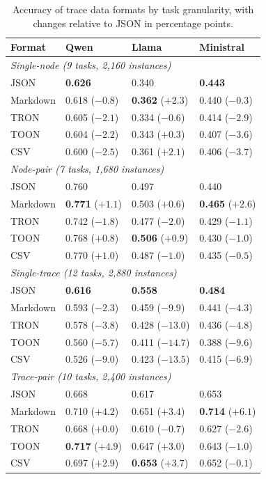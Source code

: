 \begin{table}[t]
\centering
\caption{Accuracy of trace data formats by task granularity, with changes relative to JSON in percentage points.}
\label{tab:rq1_granularity}
\begin{tabularx}{\columnwidth}{lXXX}
\toprule
Format & Qwen & Llama & Ministral \\
\midrule
\multicolumn{4}{l}{\textit{Single-node (9 tasks, 2,160 instances)}} \\
JSON & \textbf{0.626} & 0.340 & \textbf{0.443} \\
Markdown & 0.618 ($-0.8$) & \textbf{0.362} ($+2.3$) & 0.440 ($-0.3$) \\
TRON & 0.605 ($-2.1$) & 0.334 ($-0.6$) & 0.414 ($-2.9$) \\
TOON & 0.604 ($-2.2$) & 0.343 ($+0.3$) & 0.407 ($-3.6$) \\
CSV & 0.600 ($-2.5$) & 0.361 ($+2.1$) & 0.406 ($-3.7$) \\
\midrule
\multicolumn{4}{l}{\textit{Node-pair (7 tasks, 1,680 instances)}} \\
JSON & 0.760 & 0.497 & 0.440 \\
Markdown & \textbf{0.771} ($+1.1$) & 0.503 ($+0.6$) & \textbf{0.465} ($+2.6$) \\
TRON & 0.742 ($-1.8$) & 0.477 ($-2.0$) & 0.429 ($-1.1$) \\
TOON & 0.768 ($+0.8$) & \textbf{0.506} ($+0.9$) & 0.430 ($-1.0$) \\
CSV & 0.770 ($+1.0$) & 0.487 ($-1.0$) & 0.435 ($-0.5$) \\
\midrule
\multicolumn{4}{l}{\textit{Single-trace (12 tasks, 2,880 instances)}} \\
JSON & \textbf{0.616} & \textbf{0.558} & \textbf{0.484} \\
Markdown & 0.593 ($-2.3$) & 0.459 ($-9.9$) & 0.441 ($-4.3$) \\
TRON & 0.578 ($-3.8$) & 0.428 ($-13.0$) & 0.436 ($-4.8$) \\
TOON & 0.560 ($-5.7$) & 0.411 ($-14.7$) & 0.388 ($-9.6$) \\
CSV & 0.526 ($-9.0$) & 0.423 ($-13.5$) & 0.415 ($-6.9$) \\
\midrule
\multicolumn{4}{l}{\textit{Trace-pair (10 tasks, 2,400 instances)}} \\
JSON & 0.668 & 0.617 & 0.653 \\
Markdown & 0.710 ($+4.2$) & 0.651 ($+3.4$) & \textbf{0.714} ($+6.1$) \\
TRON & 0.668 ($+0.0$) & 0.610 ($-0.7$) & 0.627 ($-2.6$) \\
TOON & \textbf{0.717} ($+4.9$) & 0.647 ($+3.0$) & 0.643 ($-1.0$) \\
CSV & 0.697 ($+2.9$) & \textbf{0.653} ($+3.7$) & 0.652 ($-0.1$) \\
\bottomrule
\end{tabularx}
\end{table}

